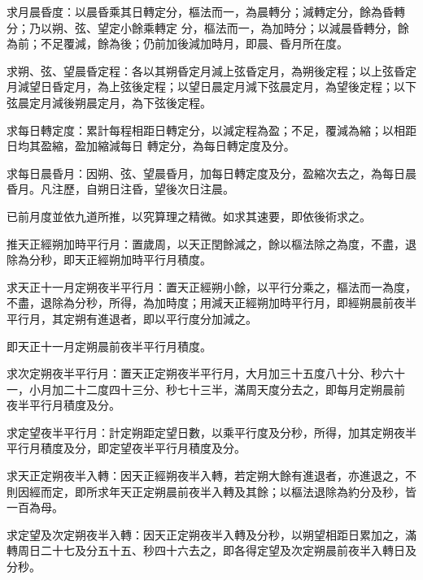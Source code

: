\begin{pinyinscope}
 求月晨昏度：以晨昏乘其日轉定分，樞法而一，為晨轉分；減轉定分，餘為昏轉分；乃以朔、弦、望定小餘乘轉定
 分，樞法而一，為加時分；以減晨昏轉分，餘為前；不足覆減，餘為後；仍前加後減加時月，即晨、昏月所在度。



 求朔、弦、望晨昏定程：各以其朔昏定月減上弦昏定月，為朔後定程；以上弦昏定月減望日昏定月，為上弦後定程；以望日晨定月減下弦晨定月，為望後定程；以下弦晨定月減後朔晨定月，為下弦後定程。



 求每日轉定度：累計每程相距日轉定分，以減定程為盈；不足，覆減為縮；以相距日均其盈縮，盈加縮減每日
 轉定分，為每日轉定度及分。



 求每日晨昏月：因朔、弦、望晨昏月，加每日轉定度及分，盈縮次去之，為每日晨昏月。凡注歷，自朔日注昏，望後次日注晨。



 已前月度並依九道所推，以究算理之精微。如求其速要，即依後術求之。



 推天正經朔加時平行月：置歲周，以天正閏餘減之，餘以樞法除之為度，不盡，退除為分秒，即天正經朔加時平行月積度。



 求天正十一月定朔夜半平行月：置天正經朔小餘，以平行分乘之，樞法而一為度，不盡，退除為分秒，所得，為加時度；用減天正經朔加時平行月，即經朔晨前夜半平行月，其定朔有進退者，即以平行度分加減之。



 即天正十一月定朔晨前夜半平行月積度。



 求次定朔夜半平行月：置天正定朔夜半平行月，大月加三十五度八十分、秒六十一，小月加二十二度四十三分、秒七十三半，滿周天度分去之，即每月定朔晨前
 夜半平行月積度及分。



 求定望夜半平行月：計定朔距定望日數，以乘平行度及分秒，所得，加其定朔夜半平行月積度及分，即定望夜半平行月積度及分。



 求天正定朔夜半入轉：因天正經朔夜半入轉，若定朔大餘有進退者，亦進退之，不則因經而定，即所求年天正定朔晨前夜半入轉及其餘；以樞法退除為約分及秒，皆一百為母。



 求定望及次定朔夜半入轉：因天正定朔夜半入轉及分秒，以朔望相距日累加之，滿轉周日二十七及分五十五、秒四十六去之，即各得定望及次定朔晨前夜半入轉日及分秒。




\end{pinyinscope}
